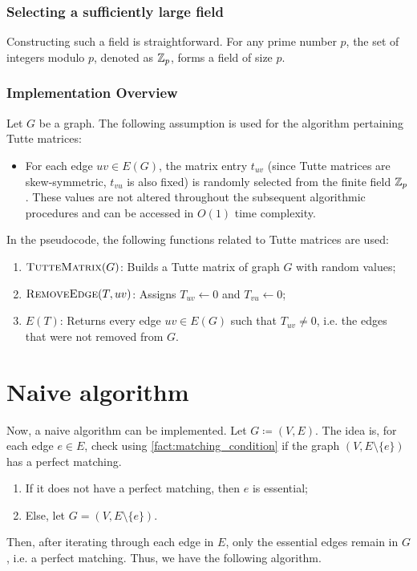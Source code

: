 \subsubsection{Selecting a sufficiently large field}
Constructing such a field is straightforward. 
For any prime number \(p\), the set of integers modulo \(p\), denoted as \(\mathbb{Z}_{p}\), forms a field of size \(p\).

\subsubsection{Implementation Overview}

Let \(G\) be a graph. The following assumption is used for the algorithm pertaining Tutte matrices:
\begin{itemize}
    \item For each edge \(uv \in E(G)\), the matrix entry \(t_{uv}\) (since Tutte matrices are skew-symmetric, \(t_{vu}\) is also fixed) is randomly selected from the finite field \(\mathbb{Z}_p\). 
    These values are not altered throughout the subsequent algorithmic procedures and can be accessed in $O(1)$ time complexity.
\end{itemize}
In the pseudocode, the following functions related to Tutte matrices are used:
\begin{enumerate}
  \item \(\textsc{TutteMatrix}(G)\): Builds a Tutte matrix of graph \(G\) with random values;
  \item \(\textsc{RemoveEdge}(T, uv)\): Assigns \(T_{uv} \gets 0\) and \(T_{vu} \gets 0\);
  \item \(E(T)\): Returns every edge \(uv \in E(G)\) such that \(T_{uv} \neq 0\), i.e. the edges that were not removed from \(G\).
\end{enumerate}

\newpage
\section{Naive algorithm}


Now, a naive algorithm can be implemented.
Let \(G \coloneqq (V, E)\).
The idea is, for each edge \(e \in E\), check using \cref{fact:matching_condition} if the graph \((V, E \setminus \{e\})\) has a perfect matching.
\begin{enumerate}
  \item If it does not have a perfect matching, then \(e\) is essential;
  \item Else, let \(G = (V, E \setminus \{e\})\).
\end{enumerate}
Then, after iterating through each edge in \(E\), only the essential edges remain in \(G\), i.e. a perfect matching.
Thus, we have the following algorithm.

